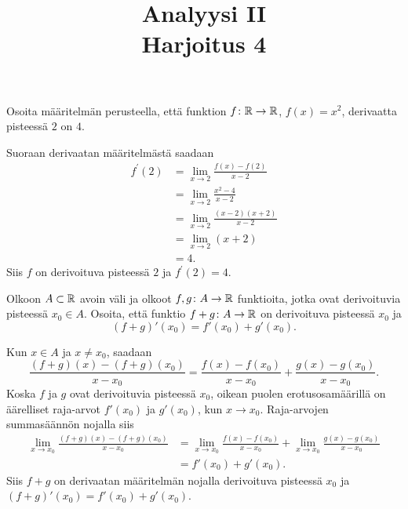 \documentclass[11pt,a4paper]{amsart}
\title{Analyysi II\\Harjoitus 4}
\author{}
\date{}
\begin{document}

\begin{exercise}
  Osoita määritelmän perusteella, että funktion
  \(f \colon \mathbb{R} \to \mathbb{R}\), \(f(x) = x^2\), derivaatta pisteessä \(2\)
  on \(4\).
\end{exercise}

\begin{solution}
  Suoraan derivaatan määritelmästä saadaan
  \[
    \begin{aligned}
      f^{\prime}(2) &= \lim_{x \to 2} \frac{f(x) - f(2)}{x - 2} \\
      &= \lim_{x \to 2} \frac{x^2 - 4}{x - 2} \\
      &= \lim_{x \to 2} \frac{(x - 2)(x + 2)}{x - 2} \\
      &= \lim_{x \to 2} (x + 2) \\
      &= 4.
    \end{aligned}
  \]
  Siis \(f\) on derivoituva pisteessä \(2\) ja \(f^{\prime}(2) = 4\).
\end{solution}

\begin{exercise}
  Olkoon \(A \subset \mathbb{R}\) avoin väli ja olkoot
  \(f, g \colon A \to \mathbb{R}\) funktioita, jotka ovat derivoituvia pisteessä
  \(x_0 \in A\). Osoita, että funktio \(f + g \colon A \to \mathbb{R}\) on
  derivoituva pisteessä \(x_0\) ja
  \[
    (f + g)'(x_0) = f'(x_0) + g'(x_0).
  \]
\end{exercise}

\begin{solution}
  Kun \(x \in A\) ja \(x \neq x_0\), saadaan
  \[
    \frac{(f + g)(x) - (f + g)(x_0)}{x - x_0}
    = \frac{f(x) - f(x_0)}{x - x_0}
    + \frac{g(x) - g(x_0)}{x - x_0}.
  \]
  Koska \(f\) ja \(g\) ovat derivoituvia pisteessä \(x_0\), oikean puolen
  erotusosamäärillä on äärelliset raja-arvot \(f'(x_0)\) ja \(g'(x_0)\),
  kun \(x \to x_0\). Raja-arvojen summasäännön nojalla siis
  \[
    \begin{aligned}
      \lim_{x \to x_0} \frac{(f + g)(x) - (f + g)(x_0)}{x - x_0}
      &= \lim_{x \to x_0} \frac{f(x) - f(x_0)}{x - x_0}
      + \lim_{x \to x_0} \frac{g(x) - g(x_0)}{x - x_0} \\
      &= f'(x_0) + g'(x_0).
    \end{aligned}
  \]
  Siis \(f + g\) on derivaatan määritelmän nojalla derivoituva pisteessä
  \(x_0\) ja \((f + g)'(x_0) = f'(x_0) + g'(x_0)\).
\end{solution}
\end{document}
